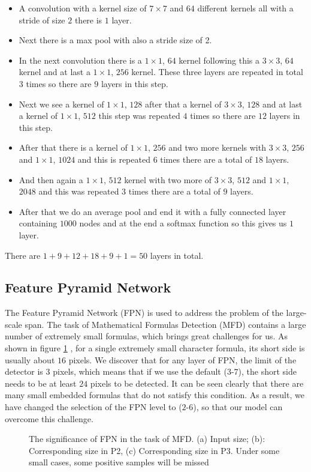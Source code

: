 \begin{itemize}
\item A convolution with a kernel size of $7 \times 7$ and $64$ different kernels all with a stride of size $2$ there is $1$ layer.
\item Next there is a max pool with also a stride size of 2.
\item In the next convolution there is a $1 \times 1$, $64$ kernel following this a $3 \times 3$, $64$ kernel and at last a $1 \times 1$, $256$ kernel. These three layers are repeated in total $3$ times so there are $9$ layers in this step.
\item Next we see a kernel of $1 \times 1$, $128$ after that a kernel of $3 \times 3$, $128$ and at last a kernel of $1 \times 1$, $512$ this step was repeated $4$ times so there are $12$ layers in this step.
\item After that there is a kernel of $1 \times 1$, $256$ and two more kernels with $3 \times 3$, $256$ and $1 \times 1$, $1024$ and this is repeated $6$ times there are a total of $18$ layers.
\item And then again a $1 \times 1$, $512$ kernel with two more of $3 \times 3$, $512$ and $1 \times 1$, $2048$ and this was repeated $3$ times there are a total of $9$ layers.
\item After that we do an average pool and end it with a fully connected layer containing $1000$ nodes and at the end a softmax function so this gives us $1$ layer.
\end{itemize}
There are $1 + 9 + 12 + 18 + 9 + 1 = 50$ layers in total.
\subsection{Feature Pyramid Network}
The Feature Pyramid Network (FPN) is used to address the problem of the large-scale span. The task of Mathematical Formulas Detection (MFD) contains a large number of extremely small formulas, which brings great challenges for us. As shown in figure \ref{fpn} \cite{1stprize}, for a single extremely small character formula, its short side is usually about $16$ pixels. We discover that for any layer of FPN, the limit of the detector is $3$ pixels, which means that if we use the default ($3$-$7$), the short side needs to be at least $24$ pixels to be detected. It can be seen clearly that there are many small embedded formulas that do not satisfy this condition. As a result, we have changed the selection of the FPN level to ($2$-$6$), so that our model can overcome this challenge.
\begin{figure}[H]
\caption{The significance of FPN in the task of MFD. (a) Input size; (b): Corresponding size in P2, (c) Corresponding size in P3. Under some small cases, some positive samples will be missed}
\label{fpn}
\end{figure}
